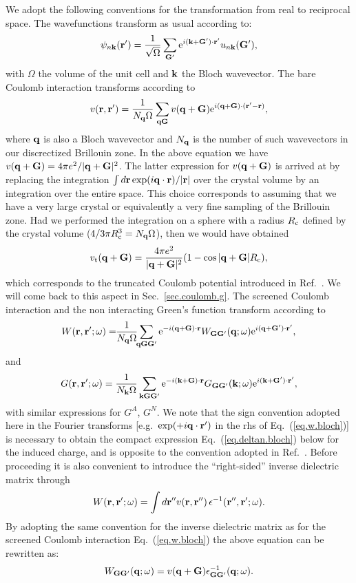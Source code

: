 \documentclass[twocolumn,prb,showpacs,superscriptaddress]{revtex4}
\def\w{\omega}
\def\q{{\bf q}}
\def\k{{\bf k}}
\def\G{{\bf G}}
\def\Gp{{\bf G^\prime}}
\def\r{{\bf r}}
\def\rp{{\bf r^\prime}}
\def\rpp{{\bf r^{\prime\prime}}}
\begin{document}
We adopt the following conventions for the transformation from real to reciprocal space.
The wavefunctions transform as usual according to:
  \begin{equation}
  \psi_{n\k}(\rp)=\frac{1}{\sqrt{\Omega}}\sum_\Gp
  {\rm e}^{i(\k+\Gp)\cdot\rp} u_{n\k}(\Gp),
  \end{equation}
with $\Omega$ the volume of the unit cell and $\k$ the Bloch wavevector.
The bare Coulomb interaction transforms according to
  \begin{equation}
  v(\r,\rp) = \frac{1}{N_\q\Omega}  \sum_{\q\G} v(\q+\G)
  {\rm e}^{i(\q+\G)\cdot(\rp-\r)},
  \end{equation}
where $\q$ is also a Bloch wavevector and $N_\q$ is the number of such wavevectors
in our discrectized Brillouin zone. In the above equation we have 
$v(\q+\G) = 4\pi e^2/|\q+\G|^2$.
The latter expression for $v(\q+\G)$ is arrived at by replacing
the integration $\int d\r \exp(i\q\cdot\r)/|\r|$ over the crystal volume by 
an integration over the entire space. This choice corresponds to assuming that we
have a very large crystal or equivalently a very fine sampling of the Brillouin zone.
Had we performed the integration on a sphere
with a radius $R_{\rm c}$ defined by the crystal volume 
($4/3\pi R_{\rm c}^3 = N_\q \Omega$), then we would have obtained
  \begin{equation}
  v_{\rm t} (\q+\G) = \frac{4\pi e^2}{|\q+\G|^2} (1-\cos |\q+\G| R_{\rm c}),
  \end{equation}
which corresponds to the truncated Coulomb potential introduced in Ref.\ .
We will come back to this aspect in Sec.\ \ref{sec.coulomb.g}.
The screened Coulomb interaction and the non interacting Green's function
transform according to
  \begin{equation}\label{eq.w.bloch}
  W(\r,\rp;\w) = \!\!\frac{1}{N_\q\Omega} \!\! \sum_{\q\G\Gp} 
  {\rm e}^{-i(\q+\G)\cdot\r}
  W_{\G\Gp}(\q;\w)
  {\rm e}^{i(\q+\Gp)\cdot\rp},
  \end{equation}
and
  \begin{equation}
  G (\r,\rp;\w) = \frac{1}{N_\k\Omega}  \sum_{\k\G\Gp} 
   {\rm e}^{-i(\k+\G)\cdot\r} 
   G_{\G\Gp}(\k;\w)
   {\rm e}^{i(\k+\Gp)\cdot\rp},
  \end{equation}
with similar expressions for $G^A$, $G^N$.
We note that the sign convention adopted here in the Fourier transforms
[e.g.\ ${\rm exp}(+i\q\cdot\rp)$ in the rhs of Eq.\ (\ref{eq.w.bloch})]
is necessary to obtain the compact expression Eq.\ (\ref{eq.deltan.bloch}) below
for the induced charge, and is opposite to the convention adopted in Ref.~.
Before proceeding it is also convenient to introduce the ``right-sided'' inverse dielectric matrix
through
  \begin{equation}
  W(\r,\rp;\w) = \int d\rpp v(\r,\rpp) \, \epsilon^{-1}(\rpp,\rp;\w).
  \end{equation}
By adopting the same convention for the inverse dielectric matrix
as for the screened Coulomb interaction Eq.\ (\ref{eq.w.bloch})
the above equation can be rewritten as:
  \begin{equation}\label{eq.Wg}
  W_{\G\Gp}(\q;\w) = v(\q+\G)  \epsilon^{-1}_{\G\Gp}(\q;\w).
  \end{equation}
\end{document}
